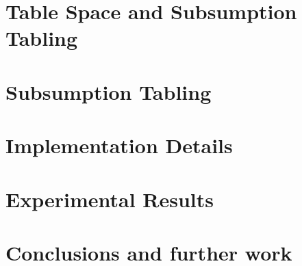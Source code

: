 \documentclass[11pt]{report}
\begin{document}
\chapter{Table Space and Subsumption Tabling}


\chapter{Subsumption Tabling}
\chapter{Implementation Details}
\chapter{Experimental Results}
\chapter{Conclusions and further work}
  
\renewcommand{\bibname}{References}

{}
\end{document}
